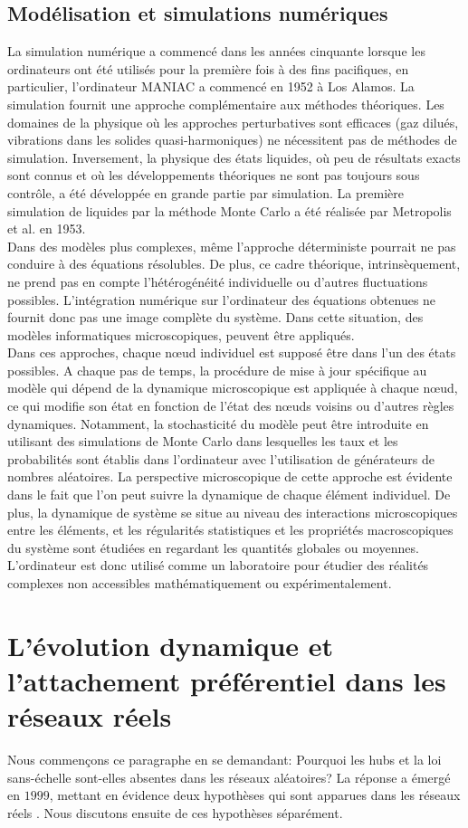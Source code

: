 \subsection{Modélisation et simulations numériques}
La simulation numérique a commencé dans les années cinquante lorsque les ordinateurs ont été utilisés pour la première fois à des fins pacifiques, en particulier, l'ordinateur MANIAC a commencé en 1952 à Los Alamos. La simulation fournit une approche complémentaire aux méthodes théoriques. Les domaines de la physique où les approches perturbatives sont efficaces (gaz dilués, vibrations dans les solides quasi-harmoniques) ne nécessitent pas de méthodes de simulation. Inversement, la physique des états liquides, où peu de résultats exacts sont connus et où les développements théoriques ne sont pas toujours sous contrôle, a été développée en grande partie par simulation. La première simulation de liquides par la méthode Monte Carlo a été réalisée par Metropolis et al. en 1953.\\
Dans des modèles plus complexes, même l'approche déterministe pourrait ne pas conduire à des équations résolubles. De plus, ce cadre théorique, intrinsèquement, ne prend pas en compte l'hétérogénéité individuelle ou d'autres fluctuations possibles. L'intégration numérique sur l'ordinateur des équations obtenues ne fournit donc pas une image complète du système. Dans cette situation, des modèles informatiques microscopiques, peuvent être appliqués.\\
Dans ces approches, chaque nœud individuel est supposé être dans l'un des états possibles. A chaque pas de temps, la procédure de mise à jour spécifique au modèle qui dépend de la dynamique microscopique est appliquée à chaque nœud, ce qui modifie son état en fonction de l'état des nœuds voisins ou d'autres règles dynamiques. Notamment, la stochasticité du modèle peut être introduite en utilisant des simulations de Monte Carlo dans lesquelles les taux et les probabilités sont établis dans l'ordinateur avec l'utilisation de générateurs de nombres aléatoires. La perspective microscopique de cette approche est évidente dans le fait que l'on peut suivre la dynamique de chaque élément individuel. De plus, la dynamique de système se situe au niveau des interactions microscopiques entre les éléments, et les régularités statistiques et les propriétés macroscopiques du système sont étudiées en regardant les quantités globales ou moyennes. L'ordinateur est donc utilisé comme un laboratoire pour étudier des réalités complexes non accessibles mathématiquement ou expérimentalement.
\begin{sloppypar}
\section{L'évolution dynamique et l'attachement préférentiel  dans les réseaux réels}
\end{sloppypar}
Nous commençons ce paragraphe en se demandant: Pourquoi les hubs et la loi sans-échelle sont-elles absentes dans les réseaux aléatoires? La réponse a émergé en $1999$, mettant en évidence deux hypothèses qui sont apparues dans les réseaux réels \cite{BA1999}. Nous discutons ensuite de ces hypothèses séparément.


